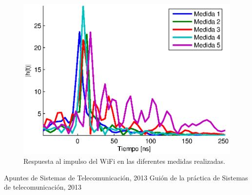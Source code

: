 \documentclass[10pt,conference,a4paper]{IEEEtran}
\begin{document}
\begin{figure}[htb]
    \centering
    \includegraphics[width=\columnwidth]{figuras/respuesta_impulso_wifi.eps}
    \caption{Respuesta al impulso del WiFi en las diferentes medidas realizadas.}
    \label{fig:respuesta_impulso_wifi}
\end{figure}


\newpage
\begin{thebibliography}{2}                                                 %
    Apuntes de Sistemas de Telecomunicación, 2013
    Guión de la práctica de Sistemas de telecomunicación, 2013
\end{thebibliography}
\end{document}
